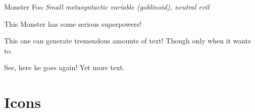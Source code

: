 \documentclass[10pt,%
  a4paper,%
  twoside,%
  openany%
  ]{book}
\begin{document}
\begin{paperbox}{\paperimagequad}
  \begin{multicols}{2}
    \begin{dsalist}
      \item \lipsum[1]
      \item \lipsum[1]
      \item \lipsum[1]
    \end{dsalist}
  \end{multicols}
\end{paperbox}
\begin{multicols}{2}

\begin{monsterbox}{Monster Foo}
  \textit{Small metasyntactic variable (goblinoid), neutral evil}\\
  \basics[%
  armorclass = 12,
  hitpoints  = 16 (3d8 + 3),
  speed      = 50 ft
  ]
  \stats[
    STR = \stat{12}, %
    DEX = \stat{7}
  ]
  \details[%
  languages = {Common Lisp, Erlang},
  ]
  \begin{monsteraction}
    This Monster has some serious superpowers!
  \end{monsteraction}
  \begin{monsteraction}
    This one can generate tremendous amounts of text! Though only when it wants to.
  \end{monsteraction}

  \begin{monsteraction}
    See, here he goes again! Yet more text.
  \end{monsteraction}
\end{monsterbox}

\section{Icons}


\dsabauer{}

\dsaspringer{}

\dsakoenig{}

\dsaturm{}


\end{multicols}
\end{document}
